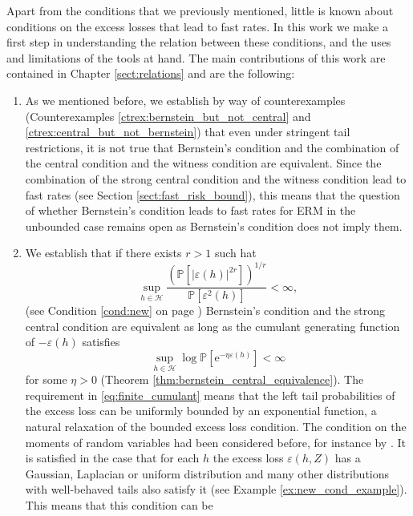 \documentclass{uvamath}
\newcommand*{\calH}{\mathcal{H}}
\newcommand*{\bbP}{\mathbb{P}}
\newcommand*{\rme}{\mathrm{e}}
\theoremstyle{remark}
\theoremstyle{definition}
\theoremstyle{definition}
\theoremstyle{definition}
\theoremstyle{definition}
\theoremstyle{definition}
\begin{document}
Apart from the conditions that we previously mentioned, little is
known about conditions on the excess losses that lead to fast
rates. In this work we make a first step in understanding the relation
between these conditions, and the uses and limitations of the tools at
hand. The main contributions of this work are contained in Chapter
\ref{sect:relations} and are the following:
\begin{enumerate}
\item As we mentioned before, we establish by way of counterexamples
  (Counterexamples \ref{ctrex:bernstein_but_not_central} and
  \ref{ctrex:central_but_not_bernstein}) that even under stringent
  tail restrictions, it is not true that Bernstein's condition and the
  combination of the central condition and the witness condition are
  equivalent. Since the combination of the strong central condition
  and the witness condition lead to fast rates (see Section
  \ref{sect:fast_risk_bound}), this means that the question of whether
  Bernstein's condition leads to fast rates for ERM in the unbounded
  case remains open as Bernstein's condition does not imply them.
\item We establish that if there exists $r>1$ such hat
  \begin{equation*}
    \sup_{h\in\calH}\frac{(\bbP[|\varepsilon(h)|^{2r}])^{1/r}}{\bbP[\varepsilon^2(h)]}
    < \infty,
  \end{equation*}
  (see Condition \ref{cond:new} on page \pageref{cond:new})
  Bernstein's condition and the strong central condition are
  equivalent as long as the cumulant generating function of
  $-\varepsilon(h)$ satisfies
  \begin{equation}\label{eq:finite_cumulant}
    \sup_{h\in\calH}\log\bbP[\rme^{-\eta\varepsilon(h)}]<\infty
  \end{equation}
  for some $\eta>0$ (Theorem \ref{thm:bernstein_central_equivalence}).
  The requirement in \eqref{eq:finite_cumulant} means that the left
  tail probabilities of the excess loss can be uniformly bounded by an
  exponential function, a natural relaxation of the bounded excess
  loss condition. The condition on the moments of random variables had
  been considered before, for instance by \citet[Lemma
  6.1]{mendelson_learning_2014}. It is satisfied in the case that for
  each $h$ the excess loss $\varepsilon(h,Z)$ has a Gaussian,
  Laplacian or uniform distribution and many other distributions with
  well-behaved tails also satisfy it (see Example
  \ref{ex:new_cond_example}). This means that this condition can be

\end{enumerate}
\end{document}
